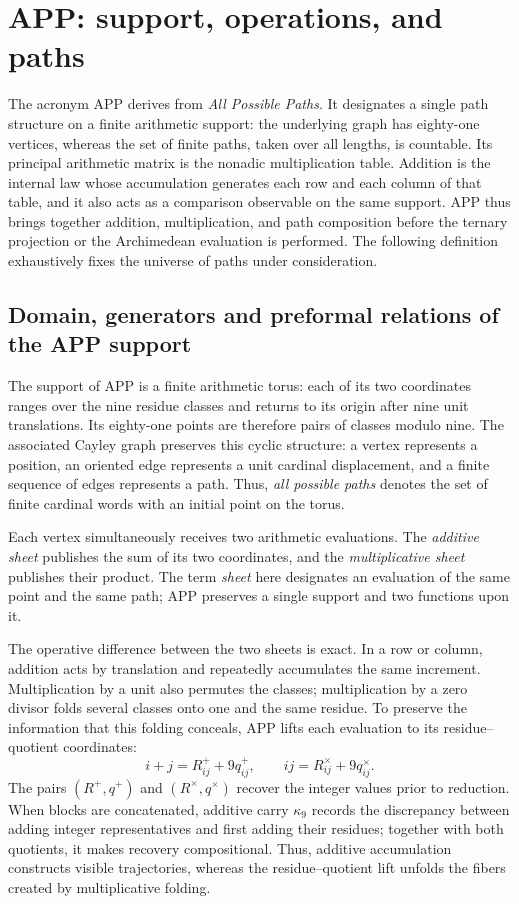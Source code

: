\ifdefined\HMTAPPFormal
\chapter{APP: support, operations, and paths}
\label{chap:app}

\noindent The acronym APP derives from \emph{All Possible Paths}. It designates a single path structure on a finite arithmetic support: the underlying graph has eighty-one vertices, whereas the set of finite paths, taken over all lengths, is countable. Its principal arithmetic matrix is the nonadic multiplication table. Addition is the internal law whose accumulation generates each row and each column of that table, and it also acts as a comparison observable on the same support. APP thus brings together addition, multiplication, and path composition before the ternary projection or the Archimedean evaluation is performed. The following definition exhaustively fixes the universe of paths under consideration.

\section{Domain, generators and preformal relations of the APP support}

The support of APP is a finite arithmetic torus: each of its two
coordinates ranges over the nine residue classes and returns to its origin after
nine unit translations. Its eighty-one points are therefore
pairs of classes modulo nine. The associated Cayley graph preserves this
cyclic structure: a vertex represents a position, an oriented edge
represents a unit cardinal displacement, and a finite sequence of
edges represents a path. Thus, \emph{all possible paths} denotes the set of finite cardinal words with an
initial point on the torus.

Each vertex simultaneously receives two arithmetic evaluations. The \emph{additive sheet} publishes the sum of its two coordinates, and the \emph{multiplicative sheet} publishes their product. The term \emph{sheet} here designates an evaluation of the same point and the same path; APP preserves a single support and two functions upon it.

The operative difference between the two sheets is exact. In a row or column,
addition acts by translation and repeatedly accumulates the same increment.
Multiplication by a unit also permutes the classes; multiplication
by a zero divisor folds several classes onto one and the same
residue. To preserve the information that this folding conceals, APP lifts
each evaluation to its residue--quotient coordinates:
\[
 i+j=R^+_{ij}+9q^+_{ij},
 \qquad
 ij=R^\times_{ij}+9q^\times_{ij}.
\]
The pairs \((R^+,q^+)\) and \((R^\times,q^\times)\) recover the integer values
prior to reduction. When blocks are concatenated, additive carry
\(\kappa_9\) records the discrepancy between adding integer representatives and
first adding their residues; together with both quotients, it makes recovery
compositional. Thus, additive accumulation constructs visible trajectories,
whereas the residue--quotient lift unfolds the fibers created by
multiplicative folding.

